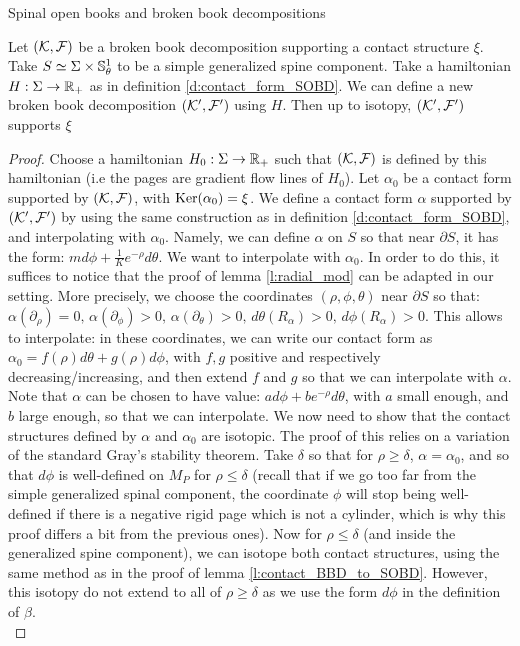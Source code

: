 \documentclass[../main.tex]{subfiles}
\begin{document}
\begin{section}{Spinal open books and broken book decompositions}
\begin{proposition}\label{p:simplification_BBD}
Let $(\mathcal{K},\mathcal{F})$ be a broken book decomposition supporting a contact structure $\xi$. Take $S\simeq \Sigma\times \mathbb{S}^1_\theta$ to be a simple generalized spine component. Take a hamiltonian $H: \Sigma\rightarrow \mathbb{R}_ +$ as in definition \ref{d:contact_form_SOBD}. We can define a new broken book decomposition $(\mathcal{K}',\mathcal{F}')$ using $H$. Then up to isotopy, $(\mathcal{K}',\mathcal{F}')$ supports $\xi$ 
\end{proposition}

\begin{proof}
Choose a hamiltonian $H_0 : \Sigma\rightarrow \mathbb{R}_+$ such that $(\mathcal{K},\mathcal{F})$ is defined by this hamiltonian (i.e the pages are gradient flow lines of $H_0$). Let $\alpha_0$ be a contact form supported by $(\mathcal{K},\mathcal{F})$, with $\text{Ker}(\alpha_0) = \xi$. We define a contact form $\alpha$ supported by $(\mathcal{K}',\mathcal{F}')$ by using the same construction as in definition \ref{d:contact_form_SOBD}, and interpolating with $\alpha_0$. Namely, we can define $\alpha$ on $S$ so that near $\partial S$, it has the form: $md\phi + \frac{1}{K}e^{-\rho}d\theta$. We want to interpolate with $\alpha_0$. In order to do this, it suffices to notice that the proof of lemma \ref{l:radial_mod} can be adapted in our setting. \color{red}More precisely, we choose the coordinates $(\rho,\phi,\theta)$ near $\partial S$ so that: $\alpha(\partial_\rho) = 0,\, \alpha(\partial_\phi) > 0, \, \alpha(\partial_\theta)> 0,\, d\theta(R_\alpha) > 0,\,d\phi(R_\alpha) > 0$.  \color{black} This allows to interpolate: in these coordinates, we can write our contact form as $\alpha_0 = f(\rho) d\theta + g(\rho) d\phi$, with $f,g$ positive and respectively decreasing/increasing, and then extend $f$ and $g$ so that we can interpolate with $\alpha$. Note that $\alpha$ can be chosen to have value: $ad\phi + be^{-\rho}d\theta$, with $a$ small enough, and $b$ large enough, so that we can interpolate. We now need to show that the contact structures defined by $\alpha$ and $\alpha_0$ are isotopic. The proof of this relies on a variation of the standard Gray's stability theorem. Take $\delta$ so that for $\rho\geq \delta$, $\alpha = \alpha_0$, and so that $d\phi$ is well-defined on $M_P$ for $\rho \leq \delta$ (recall that if we go too far from the simple generalized spinal component, the coordinate $\phi$ will stop being well-defined if there is a negative rigid page which is not a cylinder, which is why this proof differs a bit from the previous ones). Now for $\rho\leq \delta$ (and inside the generalized spine component), we can isotope both contact structures, using the same method as in the proof of lemma \ref{l:contact_BBD_to_SOBD}. However, this isotopy do not extend to all of $\rho\geq \delta$ as we use the form $d\phi$ in the definition of $\beta$. \\


\end{proof}
\end{section}
\end{document}
